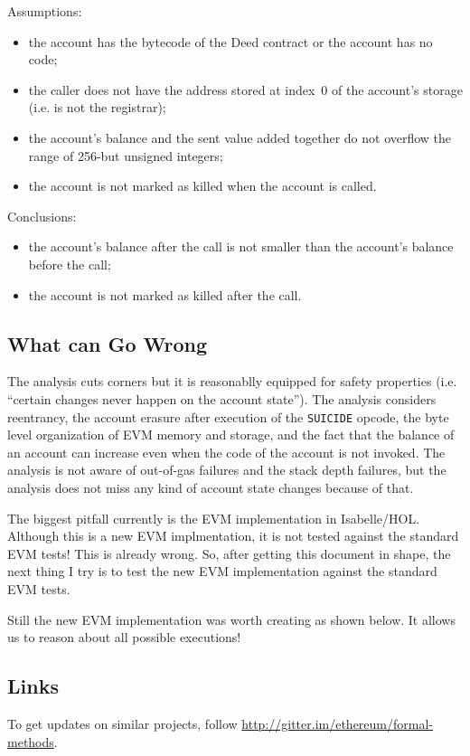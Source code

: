 \documentclass[11pt,a4paper]{article}
\begin{document}
Assumptions:
\begin{itemize}
  \item the account has the bytecode of the Deed contract or the
    account has no code;
  \item the caller does not have the address stored at index~0 of the
    account's storage (i.e. is not the registrar);
  \item the account's balance and the sent value added together do not
    overflow the range of 256-but unsigned integers;
  \item the account is not marked as killed when the account is called.
\end{itemize}

Conclusions:
\begin{itemize}
  \item the account's balance after the call is not smaller than the
    account's balance before the call;
  \item the account is not marked as killed after the call.
\end{itemize}


\subsection{What can Go Wrong}

The analysis cuts corners but it is reasonablly equipped for safety
properties (i.e. ``certain changes never happen on the account
state'').  The analysis considers reentrancy, the account erasure after execution
of the \texttt{SUICIDE} opcode, the byte level organization of EVM
memory and storage, and the fact that the balance of an account can
increase even when the code of the account is not invoked.
The analysis is not aware of out-of-gas failures and the stack depth
failures, but the analysis does not miss any kind of account state
changes because of that.

The biggest pitfall currently is the EVM implementation in
Isabelle/HOL.  Although this is a new EVM implmentation, it is not
tested against the standard EVM tests!  This is already wrong.
So, after getting this document in shape, the next thing I try is to
test the new EVM implementation against the standard EVM tests.

Still the new EVM implementation was worth creating as shown below.
It allows us to reason about all possible executions!

\subsection{Links}

To get updates on similar projects, follow \url{http://gitter.im/ethereum/formal-methods}.



%
%
\end{document}
